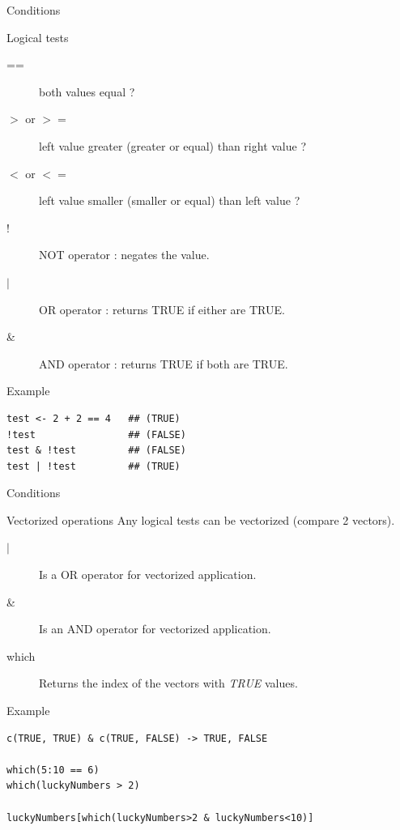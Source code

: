 \documentclass[10pt]{beamer}
\begin{document}

\begin{frame}[fragile]{Conditions}
  \begin{block}{Logical tests}
	
    \begin{description}
    \item[{\sf ==}] both values equal ?
    \item[{\sf $>$ or $>=$}] left value greater (greater or equal)
    than right value ?
	\item[{\sf $<$ or $<=$}] left value smaller (smaller or equal) than
	left value ?
    \item[!] NOT operator : negates the value.
    \item[$|$] OR operator : returns TRUE if either are TRUE.
    \item[\&] AND operator : returns TRUE if both are TRUE.
    \end{description}
  \end{block}
  \begin{exampleblock}{Example}
\begin{verbatim}
test <- 2 + 2 == 4   ## (TRUE)
!test                ## (FALSE)
test & !test         ## (FALSE)
test | !test         ## (TRUE)
\end{verbatim}  
  \end{exampleblock}
\end{frame}


\begin{frame}[fragile]{Conditions}
  \begin{block}{Vectorized operations}
  Any logical tests can be vectorized (compare 2 {\sf vector}s).
    \begin{description}
       \item[$\mid$] Is a OR operator for vectorized application.
    \item[\&] Is an AND operator for vectorized application.
    \item[which] Returns the index of the {\sf vector}s with {\it TRUE} values.
    \end{description}
  \end{block}
  \begin{exampleblock}{Example}
\begin{verbatim}
c(TRUE, TRUE) & c(TRUE, FALSE) -> TRUE, FALSE

which(5:10 == 6)
which(luckyNumbers > 2)

luckyNumbers[which(luckyNumbers>2 & luckyNumbers<10)]
\end{verbatim}  
  \end{exampleblock}
\end{frame}
\end{document}
